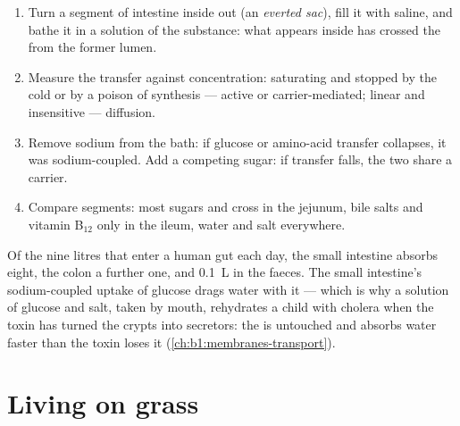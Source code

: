 \begin{method}\label{met:b1:digestion-absorption:everted}
\begin{enumerate}
  \item Turn a segment of intestine inside out (an \emph{everted sac}),
        fill it with saline, and bathe it in a solution of the
        substance: what appears inside has crossed the 
        from the former lumen.
  \item Measure the transfer against concentration: saturating and
        stopped by the cold or by a poison of  synthesis --- active
        or carrier-mediated; linear and insensitive --- diffusion.
  \item Remove sodium from the bath: if glucose or amino-acid transfer
        collapses, it was sodium-coupled. Add a competing sugar: if
        transfer falls, the two share a carrier.
  \item Compare segments: most sugars and  cross in the
        jejunum, bile salts and vitamin B$_{12}$ only in the ileum,
        water and salt everywhere.
\end{enumerate}
\end{method}

\begin{example}\label{ex:b1:digestion-absorption:water}
Of the nine litres that enter a human gut each day, the small
intestine absorbs eight, the colon a further one, and \qty{0.1}{L}
 in the faeces. The small intestine's sodium-coupled uptake of
glucose drags water with it --- which is why a solution of glucose and
salt, taken by mouth, rehydrates a child with cholera when the
toxin has turned the crypts into secretors: the  is untouched
and absorbs water faster than the toxin loses it
(\cref{ch:b1:membranes-transport}).
\end{example}

\section{Living on grass}

